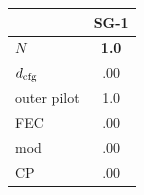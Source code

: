 \begin{tabular}{lc}
\toprule
 & SG-1 \\
\midrule
$N$ & \textbf{1.0} \\
$d_{\rm cfg}$ & .00 \\
outer pilot & 1.0 \\
FEC & .00 \\
mod & .00 \\
CP & .00 \\
\bottomrule
\end{tabular}
